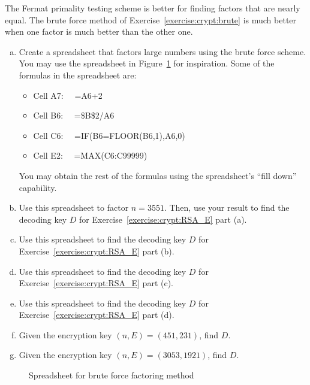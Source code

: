 The Fermat primality testing scheme is better for finding factors that are nearly equal. The brute force method of Exercise~\ref{exercise:crypt:brute}  is much better when one factor is much better than the other one.

\begin{exercise}{}
\begin{enumerate}[(a)]
\item
Create a spreadsheet that factors large numbers using the brute force scheme. You may use the spreadsheet in Figure~\ref{fig:bf} for inspiration. Some of the formulas in the spreadsheet are:
\begin{itemize}
\item
Cell A7: ~~=A6+2
\item
Cell B6:  ~~=\$B\$2/A6
\item
Cell C6:  ~~=IF(B6=FLOOR(B6,1),A6,0)
\item
Cell E2: ~~=MAX(C6:C99999)
\end{itemize}
You may obtain the rest of the formulas using the spreadsheet's ``fill down'' capability.
\item
Use this spreadsheet to factor $n=3551$. Then, use your result to find the decoding key $D$ for Exercise~\ref{exercise:crypt:RSA_E} part (a).
\item
Use this spreadsheet to  find the decoding key $D$ for Exercise~\ref{exercise:crypt:RSA_E} part (b).
\item
Use this spreadsheet to  find the decoding key $D$ for Exercise~\ref{exercise:crypt:RSA_E} part (c).
\item
Use this spreadsheet to  find the decoding key $D$ for Exercise~\ref{exercise:crypt:RSA_E} part (d).
\item
Given the encryption key $(n,E) = (451,231)$, find $D$.
\item
Given the encryption key $(n,E) = (3053,1921)$, find $D$.
\end{enumerate}
\end{exercise}

\begin{figure}[h]
\caption{Spreadsheet for brute force factoring method}
\label{fig:bf}
\end{figure}


